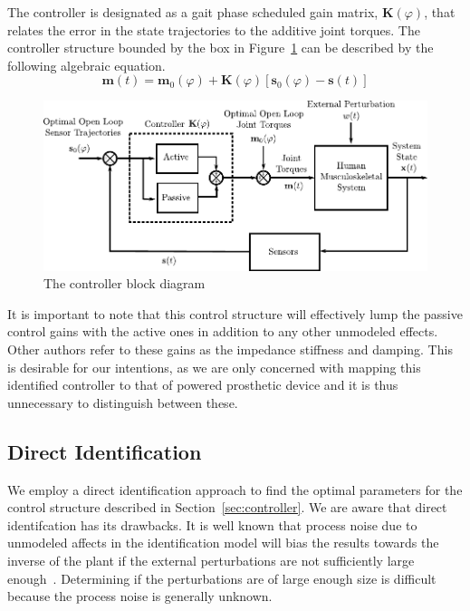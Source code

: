 \documentclass{article}
\newcommand{\K}{\mathbf{K}(\varphi)}
\begin{document}
The controller is designated as a gait phase scheduled gain matrix, $\K$, that
relates the error in the state trajectories to the additive joint torques. The
controller structure bounded by the box in Figure~\ref{fig:controller} can be
described by the following algebraic equation.
%
\begin{equation}
  \mathbf{m}(t) = \mathbf{m}_0(\varphi) + \mathbf{K}(\varphi) [\mathbf{s}_0(\varphi) - \mathbf{s}(t)]
  \label{eq:controller}
\end{equation}
%
\begin{figure}
  \centering
  \includegraphics{figures/control-system.pdf}
  \caption{The controller block diagram}
  \label{fig:controller}
\end{figure}

It is important to note that this control structure will effectively lump the
passive control gains with the active ones in addition to any other unmodeled
effects. Other authors refer to these gains as the impedance stiffness and
damping. This is desirable for our intentions, as we are only concerned with
mapping this identified controller to that of powered prosthetic device and it
is thus unnecessary to distinguish between these.

\subsection*{Direct Identification}
%
We employ a direct identification approach to find the optimal parameters for
the control structure described in Section~\ref{sec:controller}. We are aware
that direct identifcation has its drawbacks. It is well known that process
noise due to unmodeled affects in the identification model will bias the
results towards the inverse of the plant if the external perturbations are not
sufficiently large enough~\cite{Ljung1999,Kearney1990,Kooij2005}. Determining
if the perturbations are of large enough size is difficult because the process
noise is generally unknown.
\end{document}
